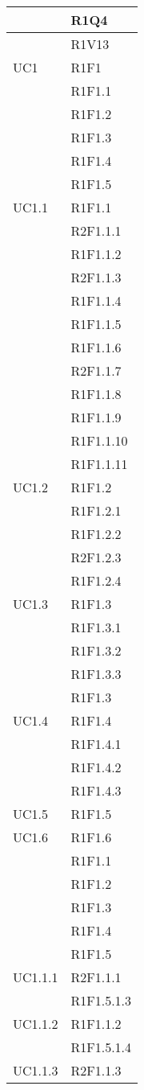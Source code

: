 \begin{longtable}{|>{\centering}m{5cm}|m{5cm}<{\centering}|}
{Verbale 2016-12-23}&{R1Q4}\\ \hline
{Verbale\_2\_E\_2017-02-24}&{R1V13}\\ \hline
{UC1}&{R1F1}\\
&{R1F1.1}\\
&{R1F1.2}\\
&{R1F1.3}\\
&{R1F1.4}\\
&{R1F1.5}\\ \hline
{UC1.1}&{R1F1.1}\\
&{R2F1.1.1}\\
&{R1F1.1.2}\\
&{R2F1.1.3}\\
&{R1F1.1.4}\\
&{R1F1.1.5}\\
&{R1F1.1.6}\\
&{R2F1.1.7}\\
&{R1F1.1.8}\\
&{R1F1.1.9}\\
&{R1F1.1.10}\\
&{R1F1.1.11}\\ \hline
{UC1.2}&{R1F1.2}\\
&{R1F1.2.1}\\
&{R1F1.2.2}\\
&{R2F1.2.3}\\
&{R1F1.2.4}\\ \hline
{UC1.3}&{R1F1.3}\\
&{R1F1.3.1}\\
&{R1F1.3.2}\\
&{R1F1.3.3}\\
&{R1F1.3}\\ \hline
{UC1.4}&{R1F1.4}\\
&{R1F1.4.1}\\
&{R1F1.4.2}\\ 
&{R1F1.4.3}\\ \hline
{UC1.5}&{R1F1.5}\\ \hline
{UC1.6}&{R1F1.6}\\
&{R1F1.1}\\
&{R1F1.2}\\
&{R1F1.3}\\
&{R1F1.4}\\
&{R1F1.5}\\ \hline
{UC1.1.1}&{R2F1.1.1}\\
&{R1F1.5.1.3}\\ \hline
{UC1.1.2}&{R1F1.1.2}\\
&{R1F1.5.1.4}\\ \hline
{UC1.1.3}&{R2F1.1.3}\\

\end{longtable}
